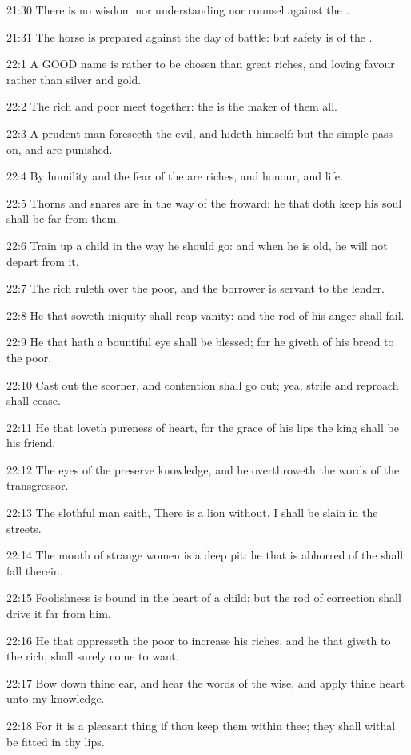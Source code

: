 21:30 There is no wisdom nor understanding nor counsel against the \LORD.

21:31 The horse is prepared against the day of battle: but safety is of the \LORD.

22:1 A GOOD name is rather to be chosen than great riches, and loving favour rather than silver and gold.

22:2 The rich and poor meet together: the \LORD is the maker of them all.

22:3 A prudent man foreseeth the evil, and hideth himself: but the simple pass on, and are punished.

22:4 By humility and the fear of the \LORD are riches, and honour, and life.

22:5 Thorns and snares are in the way of the froward: he that doth keep his soul shall be far from them.

22:6 Train up a child in the way he should go: and when he is old, he will not depart from it.

22:7 The rich ruleth over the poor, and the borrower is servant to the lender.

22:8 He that soweth iniquity shall reap vanity: and the rod of his anger shall fail.

22:9 He that hath a bountiful eye shall be blessed; for he giveth of his bread to the poor.

22:10 Cast out the scorner, and contention shall go out; yea, strife and reproach shall cease.

22:11 He that loveth pureness of heart, for the grace of his lips the king shall be his friend.

22:12 The eyes of the \LORD preserve knowledge, and he overthroweth the words of the transgressor.

22:13 The slothful man saith, There is a lion without, I shall be slain in the streets.

22:14 The mouth of strange women is a deep pit: he that is abhorred of the \LORD shall fall therein.

22:15 Foolishness is bound in the heart of a child; but the rod of correction shall drive it far from him.

22:16 He that oppresseth the poor to increase his riches, and he that giveth to the rich, shall surely come to want.

22:17 Bow down thine ear, and hear the words of the wise, and apply thine heart unto my knowledge.

22:18 For it is a pleasant thing if thou keep them within thee; they shall withal be fitted in thy lips.

